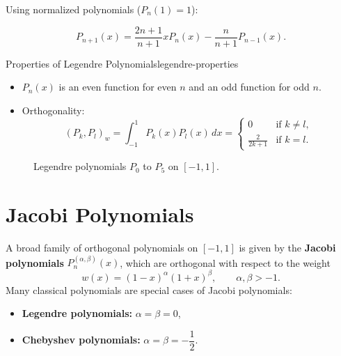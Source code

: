 Using normalized polynomials ($P_n(1)=1$):

\begin{equation}\label{eq:legendre-rec}
    P_{n+1}(x)=\frac{2n+1}{n+1}xP_n(x)-\frac{n}{n+1}P_{n-1}(x).
\end{equation}

\begin{property}{Properties of Legendre Polynomials}{legendre-properties}
    \begin{itemize}
        \item $P_n(x)$ is an even function for even $n$ and an odd function for odd $n$.
        \item Orthogonality:
              \[
                  (P_k, P_l)_w = \int_{-1}^1 P_k(x) P_l(x)\,dx =
                  \begin{cases}
                      0              & \text{if } k \neq l, \\
                      \frac{2}{2k+1} & \text{if } k = l.
                  \end{cases}
              \]
    \end{itemize}
\end{property}

\begin{figure}[htbp!]
    \centering
    
    \caption{Legendre polynomials $P_0$ to $P_5$ on $[-1,1]$.}
    \label{fig:legendre-plot}
\end{figure}

\section{Jacobi Polynomials}
\label{sec:jacobi-polynomials}
A broad family of orthogonal polynomials on $[-1,1]$ is given by the \textbf{Jacobi polynomials} $P_n^{(\alpha,\beta)}(x)$, which are orthogonal with respect to the weight
\[
    w(x) = (1-x)^\alpha (1+x)^\beta, \qquad \alpha, \beta > -1.
\]
Many classical polynomials are special cases of Jacobi polynomials:
\begin{itemize}
    \item \textbf{Legendre polynomials:} $\alpha = \beta = 0$,
    \item \textbf{Chebyshev polynomials:} $\alpha = \beta = -\dfrac{1}{2}$.
\end{itemize}


